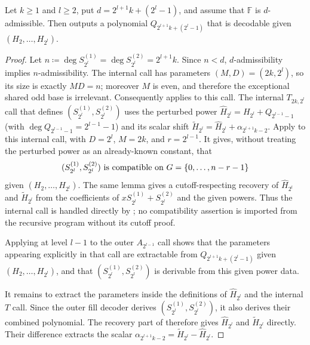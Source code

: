 \begin{lemma}\label{lem:Q-odd-degree-with-powers}
    Let $k\ge 1$ and $l\ge 2$, put
    $d=2^{l+1}k+(2^l-1)$, and assume that $\mathbb F$ is $d$-admissible.
    Then  outputs a polynomial $Q_{2^{l+1}k+(2^l-1)}$ that is decodable given $(H_2,\ldots,H_{2^l})$.
\end{lemma}
\begin{proof}
    Let $n\coloneqq\deg S^{(1)}_{2^l}=\deg S^{(2)}_{2^l}=2^{l+1}k$.
    Since $n<d$, $d$-admissibility implies $n$-admissibility.  The internal
    call has parameters $(M,D)=(2k,2^l)$, so its size is exactly $MD=n$;
    moreover $M$ is even, and therefore the exceptional shared odd base is
    irrelevant.  Consequently  applies to this
    call.
    The internal $T_{2k,2^l}$ call that defines $(S^{(1)}_{2^l},S^{(2)}_{2^l})$ uses the perturbed power
    $\hat H_{2^l}=H_{2^l}+Q_{2^{l-1}-1}$ (with $\deg Q_{2^{l-1}-1}=2^{l-1}-1$) and its scalar shift
    $\tilde H_{2^l}=\hat H_{2^l}+\alpha_{2^{l+1}k-2}$.
    Apply  to this internal call, with
    $D=2^l$, $M=2k$, and $r=2^{l-1}$.  It gives, without treating the
    perturbed power as an already-known constant, that
    \[
      (S^{(1)}_{2^l},S^{(2)}_{2^l})
      \text{ is compatible on }G=\{0,\dotsc,n-r-1\}
    \]
    given $(H_2,\ldots,H_{2^l})$.  The same lemma gives a cutoff-respecting
    recovery of $\hat H_{2^l}$ and $\tilde H_{2^l}$ from the coefficients of
    $xS^{(1)}_{2^l}+S^{(2)}_{2^l}$ and the given powers.
    Thus the internal call is handled directly by
    ; no compatibility assertion is imported
    from the recursive program without its cutoff proof.

      Applying  at level $l-1$ to the outer $A_{2^{l-1}}$ call shows that the parameters appearing explicitly in that call are extractable from $Q_{2^{l+1}k+(2^l-1)}$ given $(H_2,\ldots,H_{2^l})$, and that $(S^{(1)}_{2^l},S^{(2)}_{2^l})$ is derivable from this given power data.

    It remains to extract the parameters inside the definitions of
    $\hat H_{2^l}$ and the internal $T$ call.  Since the outer fill decoder
    derives $(S^{(1)}_{2^l},S^{(2)}_{2^l})$, it also derives their combined
    polynomial.  The recovery part of  therefore
    gives $\hat H_{2^l}$ and $\tilde H_{2^l}$ directly.  Their difference
    extracts the scalar
    $\alpha_{2^{l+1}k-2}=\tilde H_{2^l}-\hat H_{2^l}$.


\end{proof}
